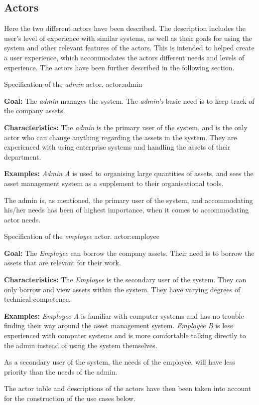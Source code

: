 \subsection{Actors} \label{scc:actors}
Here the two different actors have been described. The description includes the user's level of experience with similar systems, as well as their goals for using the system and other relevant features of the actors. This is intended to helped create a user experience, which accommodates the actors different needs and levels of experience. The actors have been further described in the following section.

    {Specification of the \textit{admin} actor.}
    {actor:admin}
    {
        \textbf{Goal:} The \textit{admin} manages the system. The \textit{admin's} basic need is to keep track of the company assets.
        \vskip 0.2cm
        
        \textbf{Characteristics:} The \textit{admin} is the primary user of the system, and is the only actor who can change anything regarding the assets in the system. They are experienced with using enterprise systems and handling the assets of their department.
        \vskip 0.2cm
        
        \textbf{Examples:} \textit{Admin A} is used to organising large quantities of assets, and sees the asset management system as a supplement to their organisational tools.
    }

The admin is, as mentioned, the primary user of the system, and accommodating his/her needs has been of highest importance, when it comes to accommodating actor needs.

    {Specification of the \textit{employee} actor.}
    {actor:employee}
    {
        \textbf{Goal:} The \textit{Employee} can borrow the company assets. Their need is to borrow the assets that are relevant for their work.
        \vskip 0.2cm
        
        \textbf{Characteristics:} The \textit{Employee} is the secondary user of the system. They can only borrow and view assets within the system. They have varying degrees of technical competence.
        \vskip 0.2cm
        
        \textbf{Examples:} \textit{Employee A} is familiar with computer systems and has no trouble finding their way around the asset management system.
        \vskip 0.1cm
        \textit{Employee B} is less experienced with computer systems and is more comfortable talking directly to the admin instead of using the system themselves. 
    }
As a secondary user of the system, the needs of the employee, will have less priority than the needs of the admin.
\par
The actor table and descriptions of the actors have then been taken into account for the construction of the use cases below.